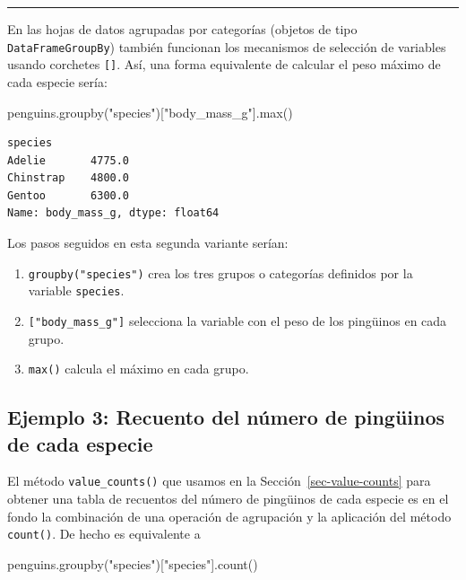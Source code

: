 \documentclass[
  a4paper,
  noprof,
  12pt,
  notoc,
  nosols,
  nobib]{mnye}
\newenvironment{Shaded}{\begin{snugshade}}{\end{snugshade}}
\newcommand{\BuiltInTok}[1]{\textcolor[rgb]{0.00,0.23,0.31}{#1}}
\newcommand{\NormalTok}[1]{\textcolor[rgb]{0.00,0.23,0.31}{#1}}
\newcommand{\StringTok}[1]{\textcolor[rgb]{0.13,0.47,0.30}{#1}}
\theoremstyle{definition}
\theoremstyle{remark}
\begin{document}
\begin{center}\rule{0.5\linewidth}{0.5pt}\end{center}

En las hojas de datos agrupadas por categorías (objetos de tipo
\texttt{DataFrameGroupBy}) también funcionan los mecanismos de selección
de variables usando corchetes \texttt{{[}{]}}. Así, una forma
equivalente de calcular el peso máximo de cada especie sería:

\begin{Shaded}
\begin{Highlighting}[]
\NormalTok{penguins.groupby(}\StringTok{"species"}\NormalTok{)[}\StringTok{"body\_mass\_g"}\NormalTok{].}\BuiltInTok{max}\NormalTok{()}
\end{Highlighting}
\end{Shaded}

\begin{verbatim}
species
Adelie       4775.0
Chinstrap    4800.0
Gentoo       6300.0
Name: body_mass_g, dtype: float64
\end{verbatim}

Los pasos seguidos en esta segunda variante serían:

\begin{enumerate}
\def\labelenumi{\arabic{enumi}.}
\item
  \texttt{groupby("species")} crea los tres grupos o categorías
  definidos por la variable \texttt{species}.
\item
  \texttt{{[}"body\_mass\_g"{]}} selecciona la variable con el peso de
  los pingüinos en cada grupo.
\item
  \texttt{max()} calcula el máximo en cada grupo.
\end{enumerate}

\subsection*{Ejemplo 3: Recuento del número de pingüinos de cada
especie}\label{ejemplo-3-recuento-del-nuxfamero-de-pinguxfcinos-de-cada-especie}


El método \texttt{value\_counts()} que usamos en la
Sección~\ref{sec-value-counts} para obtener una tabla de recuentos del
número de pingüinos de cada especie es en el fondo la combinación de una
operación de agrupación y la aplicación del método \texttt{count()}. De
hecho es equivalente a

\begin{Shaded}
\begin{Highlighting}[]
\NormalTok{penguins.groupby(}\StringTok{"species"}\NormalTok{)[}\StringTok{"species"}\NormalTok{].count()}
\end{Highlighting}
\end{Shaded}
\end{document}
